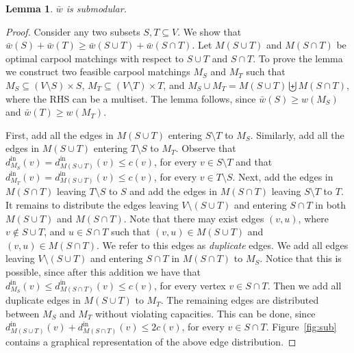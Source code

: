 \documentclass[11pt]{article}
\newtheorem{lemma}{Lemma}
\newcommand{\din}[1][M]{d^{\text{in}}_{#1}}
\newcommand{\barw}{\bar{w}}
\begin{document}
\begin{lemma}
$\barw$ is submodular.
\end{lemma}
\begin{proof}
Consider any two subsets $S, T \subseteq V$.  We show that $\barw(S)
+ \barw(T) \geq \barw(S \cup T) + \barw(S \cap T)$.
%
Let $M(S \cup T)$ and $M(S \cap T)$ be optimal carpool matchings with
respect to $S \cup T$ and $S \cap T$.
%
To prove the lemma we construct two feasible carpool matchings $M_S$
and $M_T$ such that $M_S \subseteq (V \setminus S) \times S$, $M_T
\subseteq (V \setminus T) \times T$, and $M_S \cup M_T = M(S \cup T)
\biguplus M(S \cap T)$, where the RHS can be a multiset.
%
The lemma follows, since $\barw(S) \geq w(M_S)$ and $\barw(T) \geq
w(M_T)$.

First, add all the edges in $M(S \cup T)$ entering $S \setminus T$ to
$M_S$.  Similarly, add all the edges in $M(S \cup T)$ entering
$T \setminus S$ to $M_T$.  Observe that $\din[M_S](v) = \din[M(S \cup
T)](v) \leq c(v)$, for every $v \in S \setminus T$ and that
$\din[M_T](v) = \din[M(S \cup T)](v) \leq c(v)$, for every $v \in
T \setminus S$.
%
Next, add the edges in $M(S \cap T)$ leaving $T \setminus S$ to $S$
and add the edges in $M(S \cap T)$ leaving $S \setminus T$ to $T$.
%
It remains to distribute the edges leaving $V \setminus (S \cup T)$
and entering $S \cap T$ in both $M(S \cup T)$ and $M(S \cap T)$.  Note
that there may exist edges $(v,u)$, where $v \not\in S \cup T$, and $u
\in S \cap T$ such that $(v,u) \in M(S \cup T)$ and $(v,u) \in M(S
\cap T)$.  We refer to this edges as \emph{duplicate} edges.
%
We add all edges leaving $V \setminus (S \cup T)$ and entering $S \cap
T$ in $M(S \cap T)$ to $M_S$.  Notice that this is possible, since
after this addition we have that $\din[M_S](v) \leq \din[M(S \cap
T)](v) \leq c(v)$, for every vertex $v \in S \cap T$.
%
Then we add all duplicate edges in $M(S \cup T)$ to $M_T$.
%
The remaining edges are distributed between $M_S$ and $M_T$ without
violating capacities.  This can be done, since $\din[M(S \cup T)](v)
+ \din[M(S \cap T)](v) \leq 2c(v)$, for every $v \in S \cap T$.
%
Figure~\ref{fig:sub} contains a graphical representation of the above
edge distribution.
\end{proof}
\end{document}

